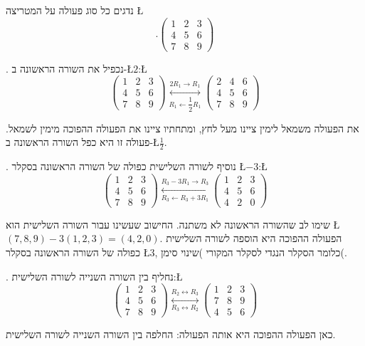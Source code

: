 \begin{examples}
נדגים כל סוג פעולה על המטריצה \L{%
\[
.\begin{pmatrix}1 & 2 & 3\\
4 & 5 & 6\\
7 & 8 & 9
\end{pmatrix}
\]
}%

{\endL}. נכפיל את השורה הראשונה ב-\L{$2$}:\L{%
\[
\begin{pmatrix}1 & 2 & 3\\
4 & 5 & 6\\
7 & 8 & 9
\end{pmatrix}\overset{2R_1 \to R_1}{\underset{R_1\leftarrow \dfrac{1}{2}R_1}{\longleftrightarrow}}\begin{pmatrix}2 & 4 & 6\\
4 & 5 & 6\\
7 & 8 & 9
\end{pmatrix}
\]
}%

את הפעולה משמאל לימין ציינו מעל לחץ, ומתחתיו ציינו את הפעולה ההפוכה
מימין לשמאל. פעולה זו היא כפל השורה הראשונה ב-\L{$\frac{1}{2}$}.

{\endL}. נוסיף לשורה השלישית כפולה של השורה הראשונה בסקלר
\L{$-3$}:\L{%
\[
\begin{pmatrix}1 & 2 & 3\\
4 & 5 & 6\\
7 & 8 & 9
\end{pmatrix}\overset{R_3-3R_1 \to R_3}{\underset{R_3\leftarrow R_3+3R_1}{\longleftrightarrow}}\begin{pmatrix}1 & 2 & 3\\
4 & 5 & 6\\
4 & 2 & 0
\end{pmatrix}
\]
}%

שימו לב שהשורה הראשונה לא משתנה. החישוב שעשינו עבור השורה השלישית
הוא \L{$(7,8,9)-3(1,2,3)=(4,2,0)$}. הפעולה ההפוכה היא הוספה לשורה
השלישית כפולה של השורה הראשונה בסקלר \L{$3$}, כלומר הסקלר הנגדי לסקלר
המקורי )שינוי סימן(.

{\endL}. נחליף בין השורה השנייה לשורה השלישית:\L{%
\[
\begin{pmatrix}1 & 2 & 3\\
4 & 5 & 6\\
7 & 8 & 9
\end{pmatrix}\overset{R_2 \leftrightarrow R_3}{\underset{R_3 \leftrightarrow R_2}{\longleftrightarrow}}\begin{pmatrix}1 & 2 & 3\\
7 & 8 & 9\\
4 & 5 & 6
\end{pmatrix}
\]
}%

כאן הפעולה ההפוכה היא אותה הפעולה: החלפה בין השורה השנייה לשורה השלישית.
\end{examples}

